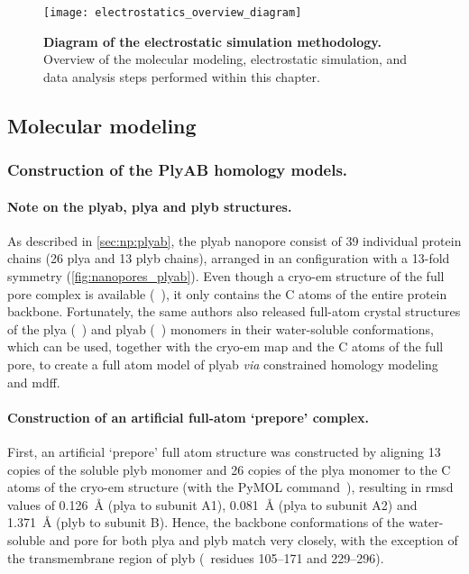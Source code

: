 %
\begin{figure*}[b]
  \centering
  
  \texttt{[image: electrostatics\_overview\_diagram]}

\caption[Diagram of the electrostatic simulation methodology]{%
  \textbf{Diagram of the electrostatic simulation methodology.}
  Overview of the molecular modeling, electrostatic simulation, and data analysis steps performed within this
  chapter.
  }\label{fig:electrostatics_overview_diagram}
\end{figure*}
%

%
%
\clearpage
%
%


\subsection{Molecular modeling}
%
\label{sec:elec:methods:molec}

\subsubsection{Construction of the PlyAB homology models.}
%

\paragraph{Note on the \gls{plyab}, \gls{plya} and \gls{plyb} structures.}
%
As described in \cref{sec:np:plyab}, the \Gls{plyab} nanopore consist of 39 individual protein chains (26
\gls{plya} and 13 \gls{plyb} chains), arranged in an  configuration with a 13-fold symmetry
(\cref{fig:nanopores_plyab}). Even though a \gls{cryo-em} structure of the full pore complex is available
(~\cite{Lukoyanova-Kondos-2015}), it only contains the C\ta{} atoms of the entire protein
backbone. Fortunately, the same authors also released full-atom crystal structures of the \gls{plya}
(~\cite{Lukoyanova-Kondos-2015}) and \gls{plyab} (~\cite{Lukoyanova-Kondos-2015})
monomers in their water-soluble conformations, which can be used, together with the \gls{cryo-em} map and the
C\ta{} atoms of the full pore, to create a full atom model of \gls{plyab} \textit{via} constrained homology
modeling and \gls{mdff}.

\paragraph{Construction of an artificial full-atom `prepore' complex.}
%
First, an artificial `prepore' full atom structure was constructed by aligning 13 copies of the soluble
\gls{plyb} monomer and 26 copies of the \gls{plya} monomer to the C\ta{} atoms of the \gls{cryo-em} structure
(with the PyMOL  command~\cite{PyMOL}), resulting in \gls{rmsd} values of \SI{0.126}{\angstrom}
(\gls{plya} to subunit A1), \SI{0.081}{\angstrom} (\gls{plya} to subunit A2) and \SI{1.371}{\angstrom}
(\gls{plyb} to subunit B). Hence, the backbone conformations of the water-soluble and pore for both \gls{plya}
and \gls{plyb} match very closely, with the exception of the transmembrane region of \gls{plyb} (\ie~residues
\numrange{105}{171} and \numrange{229}{296}).

